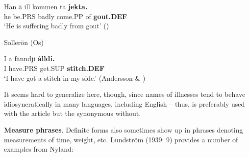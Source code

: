 
 \ea\label{}
\gll Han  ä  ill  kommen  ta  \textbf{jekta.}\\


he  be.PRS  badly  come.PP  of  \textbf{gout.DEF}\\

  ‘He is suffering badly from gout’ (\citet{Broberg1936})

\item 

Sollerön (Os) 



 \ea\label{}
\gll I  a  fänndji  \textbf{ålldi.} \\


I  have.PRS  get.SUP  \textbf{stitch.DEF} \\

\glt ‘I have got a stitch in my side.’ (Andersson \& \citet[285]{Danielsson1999})

\z

It seems hard to generalize here, though, since names of illnesses tend to behave idiosyncratically in many languages, including English – thus,  is preferably used with the article but the synonymous  without.


\textbf{Measure phrases}. Definite forms also sometimes show up in phrases denoting measurements of time, weight, etc. Lundström (1939: 9) provides a number of examples from Nyland: 


\item 


\item 

